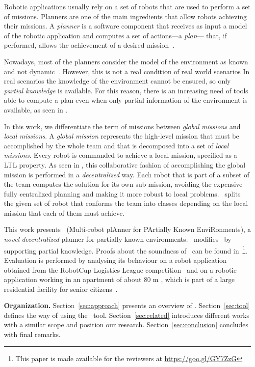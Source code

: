 Robotic applications usually rely on a set of robots that are used to perform a set of missions.
Planners are one of the main ingredients that allow robots achieving their missions.
A \emph{planner} is  a software component that receives as input a model of the robotic application and computes  a set of actions---a \emph{plan}--- that, if performed, allows the achievement of a desired mission~\cite{latombe2012robot}.

Nowadays, most of the planners consider the model of the environment as known and not dynamic~\cite{7139412}. 
However, this is not a real condition of real world scenarios
In real scenarios the knowledge of the environment cannot be ensured, so only \emph{partial knowledge} is available.
For this reason, there is an increasing need of tools able to compute a plan even when only partial information of the environment is available, as seen in \cite{roy2006planning,du2012robot,diaz2001exploring}.

In this work, we differentiate the term of missions between \emph{global missions} and \emph{local missions}.
A \emph{global mission} represents the high-level mission that must be accomplished by the whole team \cite{kloetzer2011multi,loizou2005automated,quottrup2004multi} and that is decomposed into a set of \emph{local missions}\cite{schillinger2016decomposition,guo2015multi,guo2015multi,tumova2016multi}.
Every robot is commanded to achieve a local mission, specified as a LTL property.
As seen in \cite{tumova2016multi}, this collaborative fashion of accomplishing the global mission is performed in a \emph{decentralized} way.
Each robot that is part of a subset of the team computes the solution for its own sub-mission, avoiding the expensive fully centralized planning and making it more robust to local problems.
\toolName\ splits the given set of robot that conforms the team into classes depending on the local mission that each of them must achieve.

This work presents  \toolName\ (Multi-robot plAnner for PArtially Known EnviRonments), a \emph{novel} \emph{decentralized} planner for partially known environments.
\toolName\ modifies~\cite{tumova2016multi} by supporting partial knowledge.
Proofs about the soundness of \toolName\ can be found in~\cite{mapmaker17}\footnote{This paper is made available for the reviewers   at  \url{https://goo.gl/GY7ZzG}}.
Evaluation is performed by analysing its behaviour on a robot application obtained from the RobotCup Logistics League competition~\cite{karrasrobocup} and on a robotic application working in an apartment of about 80 m , which is part of
a large residential facility for senior citizens~\cite{map}.

\textbf{Organization.} 
Section~\ref{sec:approach} presents an overview of \toolName.
Section~\ref{sec:tool} defines the way of using the \toolName\ tool.
Section~\ref{sec:related} introduces different works with a similar scope and position our research.
Section~\ref{sec:conclusion} concludes with final remarks.

